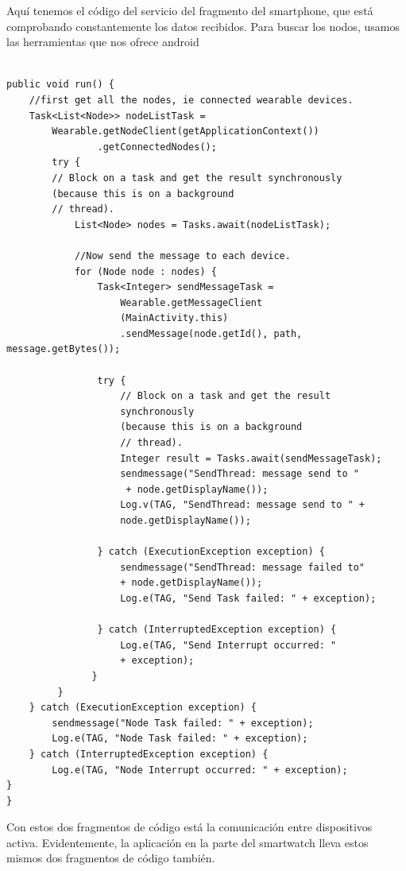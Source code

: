 \documentclass[12pt]{article}
\numberwithin{equation}{section}
\begin{document}
Aquí tenemos el código del servicio del fragmento del smartphone, que está comprobando constantemente los datos recibidos. Para buscar los nodos, usamos las herramientas que nos ofrece android

\begin{lstlisting}

public void run() {
	//first get all the nodes, ie connected wearable devices.
    Task<List<Node>> nodeListTask =
    	Wearable.getNodeClient(getApplicationContext())
                .getConnectedNodes();
        try {
        // Block on a task and get the result synchronously 
        (because this is on a background
        // thread).
        	List<Node> nodes = Tasks.await(nodeListTask);

      	    //Now send the message to each device.
            for (Node node : nodes) {
            	Task<Integer> sendMessageTask =
                	Wearable.getMessageClient
                    (MainActivity.this)
                    .sendMessage(node.getId(), path, 			                            					message.getBytes());

                try {
                	// Block on a task and get the result 	
                	synchronously 
                	(because this is on a background
                    // thread).
                    Integer result = Tasks.await(sendMessageTask);
                    sendmessage("SendThread: message send to "
                     + node.getDisplayName());
                    Log.v(TAG, "SendThread: message send to " + 
                    node.getDisplayName());

                } catch (ExecutionException exception) {
                	sendmessage("SendThread: message failed to"
                	+ node.getDisplayName());
                    Log.e(TAG, "Send Task failed: " + exception);

                } catch (InterruptedException exception) {
                    Log.e(TAG, "Send Interrupt occurred: "
                    + exception);
               }
         }
    } catch (ExecutionException exception) {
    	sendmessage("Node Task failed: " + exception);
        Log.e(TAG, "Node Task failed: " + exception);
    } catch (InterruptedException exception) {
        Log.e(TAG, "Node Interrupt occurred: " + exception);
}
}
\end{lstlisting}

Con estos dos fragmentos de código está la comunicación entre dispositivos activa. Evidentemente, la aplicación en la parte del smartwatch lleva estos mismos dos fragmentos de código también.
\end{document}

